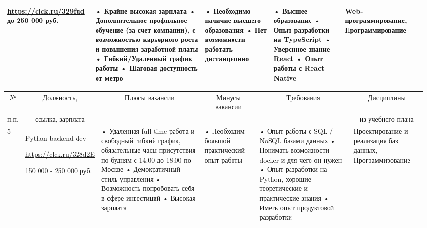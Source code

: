 \documentclass[14pt]{extreport}
\begin{document}
\begin{landscape}
\begin{table}[H]
\begin{center}
\begin{small}
\begin{tabular}{|p{0.1cm}|p{5cm}|p{4.5cm}|p{4.5cm}|p{4cm}|p{3cm}|}
				\url{https://clck.ru/329fud}
				до 250 000 руб.
				&
				• Крайне высокая зарплата
				\newline• Дополнительное профильное обучение (за счет компании), с возможностью карьерного роста и повышения заработной платы
				\newline• Гибкий/Удаленный график работы
				\newline• Шаговая доступность от метро
				&
				• Необходимо наличие высшего образования
				\newline• Нет возможности работать дистанционно
				&
				• Высшее образование
				\newline• Опыт разработки на TypeScript
				\newline• Уверенное знание React
				\newline• Опыт работы с React Native
				&
				Web-программирование, Программирование
				\\
				\hline
		\end{tabular}
	\end{small}
	\end{center}
\end{table}
\begin{table}[H]
	\begin{center}
		\begin{small}
		\begin{tabular}{|p{0.1cm}|p{5cm}|p{4.5cm}|p{4.5cm}|p{4cm}|p{3cm}|} \hline
			\multicolumn{1}{|c|}{№}&\multicolumn{1}{c|}{Должность,}&\multicolumn{1}{c|}{Плюсы вакансии}&\multicolumn{1}{c|}{Минусы вакансии}&\multicolumn{1}{c|}{Требования}&\multicolumn{1}{c|}{Дисциплины}\\ 
			\multicolumn{1}{|c|}{п.п.}&\multicolumn{1}{c|}{ссылка, зарплата}&\multicolumn{1}{c|}{}&\multicolumn{1}{c|}{}&\multicolumn{1}{c|}{}&\multicolumn{1}{c|}{из учебного плана}\\ 
			\hline
				5 & Python backend dev
				
				\url{https://clck.ru/328d2E}
				
				150 000 - 250 000 руб. &
				• Удаленная full-time работа и свободный гибкий график, обязательные часы присутствия по будням с 14:00 до 18:00 по Москве
				\newline• Демократичный стиль управления
				\newline• Возможность попробовать себя в сфере инвестиций
				\newline• Высокая зарплата
				&
				• Необходим большой практический опыт работы
				&
				• Опыт работы с SQL / NoSQL базами данных
				\newline• Понимать возможности docker и для чего он нужен
				\newline• Опыт разработки на Python, хорошие теоретические и практические знания
				\newline• Иметь опыт продуктовой разработки
				&
				Проектирование и реализация баз данных, Программирование
				\\
				\hline
				

\end{tabular}
\end{small}
\end{center}
\end{table}
\end{landscape}
\end{document}
